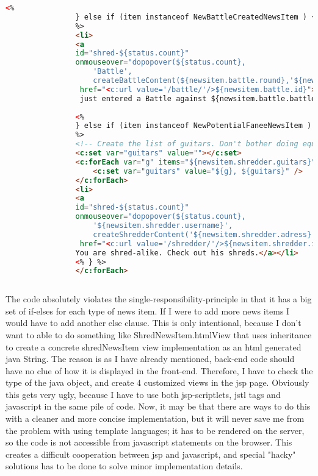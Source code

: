 \begin{lstlisting}[language=html]
				<%
				} else if (item instanceof NewBattleCreatedNewsItem ) {
				%>
				<li>
				<a
				id="shred-${status.count}"
				onmouseover="dopopover(${status.count},
					'Battle', 
					createBattleContent(${newsitem.battle.round},'${newsitem.battle.status}', '${newsitem.battle.battler.shredder.username}', '${newsitem.battle.battlee.shredder.username}'));" 
				 href="<c:url value='/battle/'/>${newsitem.battle.id}">${newsitem.battle.battler.shredder.username}
				 just entered a Battle against ${newsitem.battle.battlee.shredder.username} at ${newsitem.timeCreated}</a></li>
				
				<%
				} else if (item instanceof NewPotentialFaneeNewsItem ) {
				%>
				<!-- Create the list of guitars. Don't bother doing equiptment, it's such a hazzle! -->
				<c:set var="guitars" value=""></c:set>
				<c:forEach var="g" items="${newsitem.shredder.guitars}">
					<c:set var="guitars" value="${g}, ${guitars}" /> 
				</c:forEach>
				<li> 
				<a
				id="shred-${status.count}"
				onmouseover="dopopover(${status.count},
					'${newsitem.shredder.username}', 
					createShredderContent('${newsitem.shredder.adress}','${newsitem.shredder.description}','${guitars}' ));"		
				 href="<c:url value='/shredder/'/>${newsitem.shredder.id}">${newsitem.shredder.username} just joined ShredHub.
				You are shred-alike. Check out his shreds.</a></li>
				<% } %>
				</c:forEach>
		  
		  \end{lstlisting}
		  
		  
		  The code absolutely violates the single-responsibility-principle in that it has a big set of if-elses for each type of news item. If I were to add more news items I would have to add another else clause. This is only intentional, because I don't want to able to do something like ShredNewsItem.htmlView that uses inheritance to create a concrete shredNewsItem view implementation as an html generated java String. The reason is as I have already mentioned, back-end code should have no clue of how it is displayed in the front-end. Therefore, I have to check the type of the java object, and create 4 customized views in the jsp page. Obviously this gets very ugly, because I have to use both jsp-scriptlets, jstl tags and javascript in the same pile of code. Now, it may be that there are ways to do this with a cleaner and more concise implementation, but it will never save me from the problem with using template languages; it has to be rendered on the server, so the code is not accessible from javascript statements on the browser. This creates a difficult cooperation between jsp and javascript, and special "hacky" solutions has to be done to solve minor implementation details.
		  










